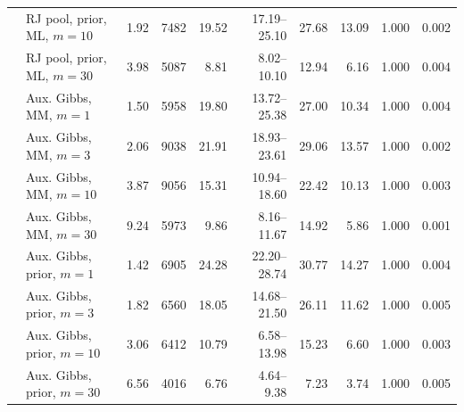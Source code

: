 \begin{tabular}{ll rrrrrrrr}
 & RJ pool, prior, ML, $m{=}10$ & 1.92 & 7482 & 19.52 & 17.19--25.10 & 27.68 & 13.09 & 1.000 & 0.002 \\
 & RJ pool, prior, ML, $m{=}30$ & 3.98 & 5087 & 8.81 & 8.02--10.10 & 12.94 & 6.16 & 1.000 & 0.004 \\
 & Aux. Gibbs, MM, $m{=}1$ & 1.50 & 5958 & 19.80 & 13.72--25.38 & 27.00 & 10.34 & 1.000 & 0.004 \\
 & Aux. Gibbs, MM, $m{=}3$ & 2.06 & 9038 & 21.91 & 18.93--23.61 & 29.06 & 13.57 & 1.000 & 0.002 \\
 & Aux. Gibbs, MM, $m{=}10$ & 3.87 & 9056 & 15.31 & 10.94--18.60 & 22.42 & 10.13 & 1.000 & 0.003 \\
 & Aux. Gibbs, MM, $m{=}30$ & 9.24 & 5973 & 9.86 & 8.16--11.67 & 14.92 & 5.86 & 1.000 & 0.001 \\
 & Aux. Gibbs, prior, $m{=}1$ & 1.42 & 6905 & 24.28 & 22.20--28.74 & 30.77 & 14.27 & 1.000 & 0.004 \\
 & Aux. Gibbs, prior, $m{=}3$ & 1.82 & 6560 & 18.05 & 14.68--21.50 & 26.11 & 11.62 & 1.000 & 0.005 \\
 & Aux. Gibbs, prior, $m{=}10$ & 3.06 & 6412 & 10.79 & 6.58--13.98 & 15.23 & 6.60 & 1.000 & 0.003 \\
 & Aux. Gibbs, prior, $m{=}30$ & 6.56 & 4016 & 6.76 & 4.64--9.38 & 7.23 & 3.74 & 1.000 & 0.005 \\
\bottomrule
\end{tabular}
